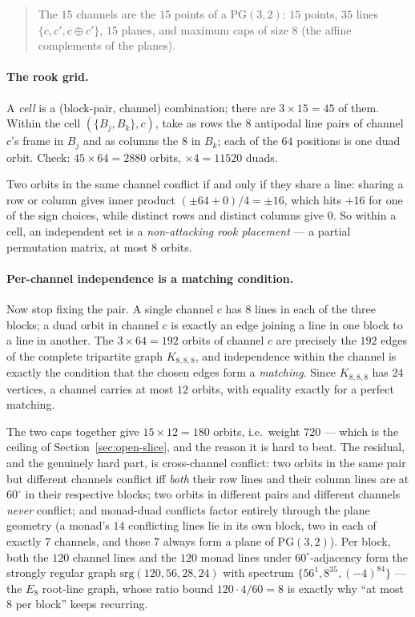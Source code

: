 \documentclass[10pt,a4paper]{article}
\begin{document}
\begin{quote}
The $15$ channels are the $15$ points of a $\mathrm{PG}(3,2)$: $15$ points, $35$ lines
$\{c, c', c \oplus c'\}$, $15$ planes, and maximum caps of size $8$ (the affine complements of the
planes).
\end{quote}

\paragraph{The rook grid.} A \emph{cell} is a (block-pair, channel) combination; there are
$3 \times 15 = 45$ of them. Within the cell $(\{B_j,B_k\}, c)$, take as rows the $8$ antipodal line
pairs of channel $c$'s frame in $B_j$ and as columns the $8$ in $B_k$; each of the $64$ positions is
one duad orbit. Check: $45 \times 64 = 2880$ orbits, $\times 4 = 11520$ duads.

Two orbits in the same channel conflict if and only if they share a line: sharing a row or column
gives inner product $(\pm 64 + 0)/4 = \pm 16$, which hits $+16$ for one of the sign choices, while
distinct rows and distinct columns give $0$. So within a cell, an independent set is a
\emph{non-attacking rook placement} --- a partial permutation matrix, at most $8$ orbits.

\paragraph{Per-channel independence is a matching condition.} Now stop fixing the pair. A single
channel $c$ has $8$ lines in each of the three blocks; a duad orbit in channel $c$ is exactly an edge
joining a line in one block to a line in another. The $3 \times 64 = 192$ orbits of channel $c$ are
precisely the $192$ edges of the complete tripartite graph $K_{8,8,8}$, and independence within the
channel is exactly the condition that the chosen edges form a \emph{matching}. Since $K_{8,8,8}$ has
$24$ vertices, a channel carries at most $12$ orbits, with equality exactly for a perfect matching.

The two caps together give $15 \times 12 = 180$ orbits, i.e.\ weight $720$ --- which is the ceiling
of Section~\ref{sec:open-slice}, and the reason it is hard to beat. The residual, and the genuinely
hard part, is cross-channel conflict: two orbits in the same pair but different channels conflict
iff \emph{both} their row lines and their column lines are at $60^\circ$ in their respective blocks;
two orbits in different pairs and different channels \emph{never} conflict; and monad-duad conflicts
factor entirely through the plane geometry (a monad's $14$ conflicting lines lie in its own block,
two in each of exactly $7$ channels, and those $7$ always form a plane of $\mathrm{PG}(3,2)$). Per
block, both the $120$ channel lines and the $120$ monad lines under $60^\circ$-adjacency form the
strongly regular graph $\mathrm{srg}(120,56,28,24)$ with spectrum $\{56^1, 8^{35}, (-4)^{84}\}$ ---
the $E_8$ root-line graph, whose ratio bound $120 \cdot 4/60 = 8$ is exactly why ``at most $8$ per
block'' keeps recurring.
\end{document}
